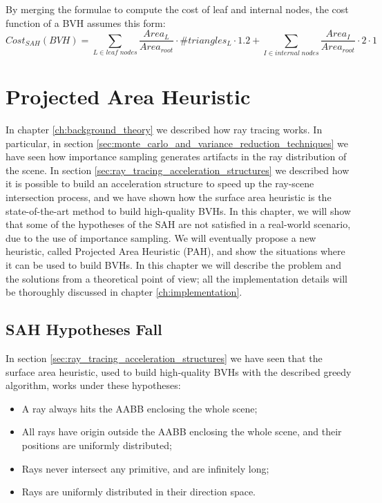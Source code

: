 \documentclass{PoliMi_MasterThesis}
\begin{document}
By merging the formulae to compute the cost of leaf and internal nodes, the cost function of a BVH assumes this form:
$$Cost_{SAH}(BVH) = \sum_{L \in leaf\; nodes} \frac{Area_L}{Area_{root}} \cdot \#triangles_L \cdot 1.2 + \sum_{I \in internal\; nodes} \frac{Area_I}{Area_{root}} \cdot 2 \cdot 1$$

\chapter{Projected Area Heuristic} \label{ch:projected_area_heuristic}
In chapter \ref{ch:background_theory} we described how ray tracing works. In particular, in section \ref{sec:monte_carlo_and_variance_reduction_techniques} we have seen how importance sampling generates artifacts in the ray distribution of the scene. In section \ref{sec:ray_tracing_acceleration_structures} we described how it is possible to build an acceleration structure to speed up the ray-scene intersection process, and we have shown how the surface area heuristic is the state-of-the-art method to build high-quality BVHs. In this chapter, we will show that some of the hypotheses of the SAH are not satisfied in a real-world scenario, due to the use of importance sampling. We will eventually propose a new heuristic, called Projected Area Heuristic (PAH), and show the situations where it can be used to build BVHs. In this chapter we will describe the problem and the solutions from a theoretical point of view; all the implementation details will be thoroughly discussed in chapter \ref{ch:implementation}.

\section{SAH Hypotheses Fall} \label{sec:sah_hypotheses_fall}
In section \ref{sec:ray_tracing_acceleration_structures} we have seen that the surface area heuristic, used to build high-quality BVHs with the described greedy algorithm, works under these hypotheses:
\begin{itemize}
	\item A ray always hits the AABB enclosing the whole scene;
	\item All rays have origin outside the AABB enclosing the whole scene, and their positions are uniformly distributed;
	\item Rays never intersect any primitive, and are infinitely long;
	\item Rays are uniformly distributed in their direction space.
\end{itemize}
\end{document}
